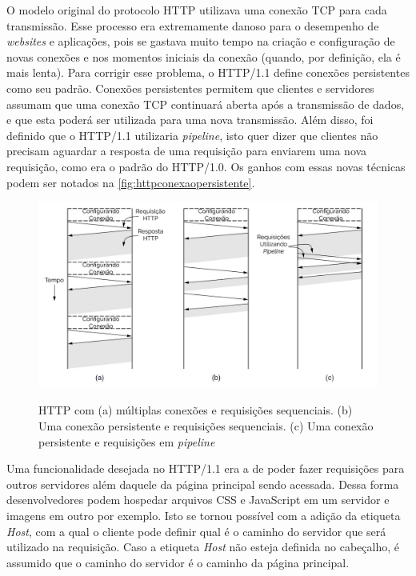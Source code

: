 O modelo original do protocolo HTTP utilizava uma conexão TCP para cada transmissão. Esse processo era extremamente danoso para o desempenho de \textit{websites} e aplicações, pois se gastava muito tempo na criação e configuração de novas conexões e nos momentos iniciais da conexão (quando, por definição, ela é mais lenta). Para corrigir esse problema, o HTTP/1.1 define conexões persistentes como seu padrão. Conexões persistentes permitem que clientes e servidores assumam que uma conexão TCP continuará aberta após a transmissão de dados, e que esta poderá ser utilizada para uma nova transmissão. Além disso, foi definido que o HTTP/1.1 utilizaria \textit{pipeline}, isto quer dizer que clientes não precisam aguardar a resposta de uma requisição para enviarem uma nova requisição, como era o padrão do HTTP/1.0. Os ganhos com essas novas técnicas podem ser notados na \autoref{fig:httpconexaopersistente}.

\begin{figure}[!htb]
    \centering
    \caption{HTTP com (a) múltiplas conexões e requisições sequenciais. (b) Uma conexão persistente e requisições sequenciais. (c) Uma conexão persistente e requisições em \textit{pipeline}}
    \includegraphics[width=1.0\textwidth]{./04-figuras/fund-teorica/httpconexaopersistente}
    \label{fig:httpconexaopersistente}
\end{figure}

Uma funcionalidade desejada no HTTP/1.1 era a de poder fazer requisições para outros servidores além daquele da página principal sendo acessada. Dessa forma desenvolvedores podem hospedar arquivos CSS e JavaScript em um servidor e imagens em outro por exemplo. Isto se tornou possível com a adição da etiqueta \textit{Host}, com a qual o cliente pode definir qual é o caminho do servidor que será utilizado na requisição. Caso a etiqueta \textit{Host} não esteja definida no cabeçalho, é assumido que o caminho do servidor é o caminho da página principal.

